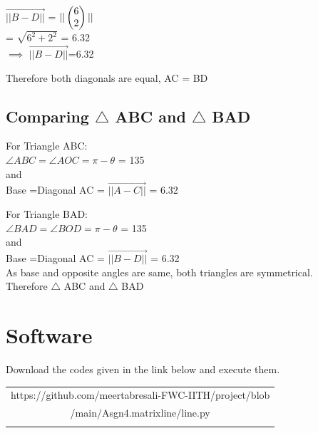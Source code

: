 \documentclass[journal,10pt,twocolumn]{article}
\begin{document}
$\vec{||B-D||}$ =  $||\begin{pmatrix}6 \\2\end{pmatrix}||$
	\\
\vspace{0.25cm}
= $\sqrt{6^2+2^2}$ = 6.32\\
\vspace{0.25cm}
$\implies$ $\vec{||B-D||}$=6.32\\
\begin{flushleft}
Therefore both diagonals are equal,  AC = BD \\
\end{flushleft}

\subsection{Comparing $\triangle$ ABC and $\triangle$ BAD }
\begin{flushleft}
\vspace{0.25cm}
For Triangle ABC:\\
\vspace{0.25cm}
$\angle ABC = \angle AOC = \pi -\theta$ = 135 \textdegree \\
\vspace{0.25cm}
and\\
\vspace{0.25cm}
Base =Diagonal AC  = $\vec{||A-C||}$ = 6.32\\
\vspace{0.35cm}

For Triangle BAD:\\
\vspace{0.25cm}
$\angle BAD = \angle BOD = \pi -\theta$ = 135 \textdegree \\
\vspace{0.25cm}
and\\
\vspace{0.25cm}
Base =Diagonal AC  = $\vec{||B-D||} $ = 6.32\\
\vspace{0.35cm}
As base and opposite angles are same, both triangles are symmetrical.
\vspace{0.25cm}\\
Therefore  $\triangle$ ABC and $\triangle$ BAD
\end{flushleft}

\section{Software}
\centering
Download the codes given in the link below and execute them.\\
\begin{table}[h]
\centering
\begin{tabular}{|c|} \hline
\rule{0pt}{10pt} 
https://github.com/meertabresali-FWC-IITH/project/blob \\
/main/Asgn4.matrixline/line.py\\
\\\hline
 \end{tabular}
\end{table}
\end{document}
